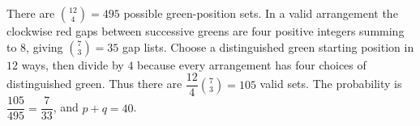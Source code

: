 There are $\binom{12}{4}=495$ possible green-position sets. In a valid arrangement the clockwise red gaps between successive greens are four positive integers summing to $8$, giving $\binom73=35$ gap lists. Choose a distinguished green starting position in $12$ ways, then divide by $4$ because every arrangement has four choices of distinguished green. Thus there are $\dfrac{12}{4}\binom73=105$ valid sets. The probability is $\dfrac{105}{495}=\dfrac{7}{33}$, and $\boxed{p+q=40}$.
